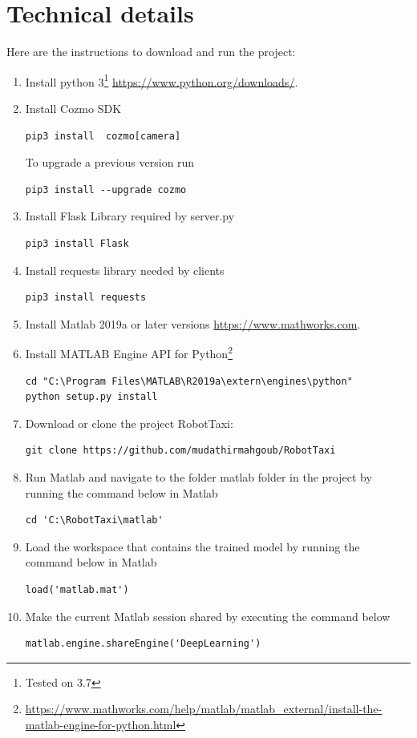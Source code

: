 \documentclass[12pt,a4paper]{article}
\begin{document}
\section{Technical details} \label{sec:technical}

Here are the instructions to download and run the project:

\begin{enumerate}
\item Install python 3\footnote{Tested on 3.7} \url{https://www.python.org/downloads/}.
\item Install Cozmo SDK 
\begin{verbatim}
pip3 install  cozmo[camera]
\end{verbatim}
To upgrade a previous version run 
\begin{verbatim}
pip3 install --upgrade cozmo
\end{verbatim}
\item Install Flask Library required by server.py
\begin{verbatim}
pip3 install Flask
\end{verbatim}
\item Install requests library needed by clients
\begin{verbatim}
pip3 install requests
\end{verbatim}

\item Install Matlab 2019a or later versions \url{https://www.mathworks.com}.
\item Install MATLAB Engine API for Python\footnote{\url{https://www.mathworks.com/help/matlab/matlab_external/install-the-matlab-engine-for-python.html}}
\begin{verbatim}
cd "C:\Program Files\MATLAB\R2019a\extern\engines\python"
python setup.py install
\end{verbatim}
\item Download or clone the project RobotTaxi:
\begin{verbatim}
git clone https://github.com/mudathirmahgoub/RobotTaxi
\end{verbatim}
\item Run Matlab and navigate to the folder matlab folder in the project by running the command below in Matlab
\begin{verbatim}
cd 'C:\RobotTaxi\matlab'
\end{verbatim}

\item Load the workspace that contains the trained model by running the command below in Matlab 
\begin{verbatim}
load('matlab.mat')
\end{verbatim}
\item Make the current Matlab session shared by executing the command below
\begin{verbatim}
matlab.engine.shareEngine('DeepLearning')
\end{verbatim}


\end{enumerate}
\end{document}

